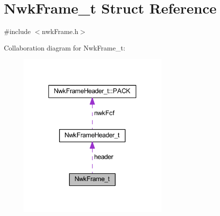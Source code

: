 \hypertarget{struct_nwk_frame__t}{\section{Nwk\-Frame\-\_\-t Struct Reference}
\label{struct_nwk_frame__t}
}


{\ttfamily \#include $<$nwk\-Frame.\-h$>$}



Collaboration diagram for Nwk\-Frame\-\_\-t\-:
\nopagebreak
\begin{figure}[H]
\begin{center}
\leavevmode
\includegraphics[width=214pt]{struct_nwk_frame__t__coll__graph}
\end{center}
\end{figure}
